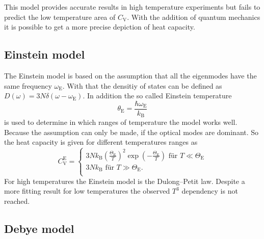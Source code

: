 This model provides accurate results in high temperature experiments but fails to predict the low temperature area of $C_\text{V}$.
With the addition of quantum mechanics it is possible to get a more precise depiction of heat capacity.

\subsection{Einstein model}
\label{ssec:theory3}

The Einstein model is based on the assumption that all the eigenmodes have the same frequency $\omega_\text{E}$.
With that the densitiy of states can be defined as $D (\omega) = 3 N \delta (\omega - \omega_\text{E})$.
In addition the so called Einstein temperature 
\begin{equation}
    \theta_\text{E} = \frac{\hbar \omega_\text{E}}{k_\text{B}}
    \label{eq:einstein}
\end{equation}
is used to determine in which ranges of temperature the model works well.
Because the assumption can only be made, if the optical modes are dominant.
So the heat capacity is given for different temperatures ranges as
\begin{equation}
    C_\text{V}^\text{E} =
      \begin{cases}
        3 N k_\text{B} \left( \frac{\Theta_\text{E}}{T}   \right)^2 \exp(- \frac{\Theta_\text{E}}{T}) \,\, \text{für} \,\,  T \ll \Theta_\text{E}\\
        3 N k_\text{B} \,\, \text{für} \,\, T \gg \Theta_\text{E}.\\
        \end{cases}
\end{equation}
For high temperatures the Einstein model is the Dulong–Petit law.
Despite a more fitting result for low temperatures the observed $T^3$ dependency is not reached.

\subsection{Debye model}
\label{ssec:theory4}

